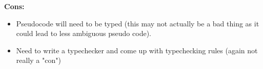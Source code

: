 \textbf{Cons:}
\begin{itemize}

\item Pseudocode will need to be typed (this may not actually be a bad thing as it could lead to less ambiguous pseudo code).

\item Need to write a typechecker and come up with typechecking rules (again not really a "con")

\end{itemize}